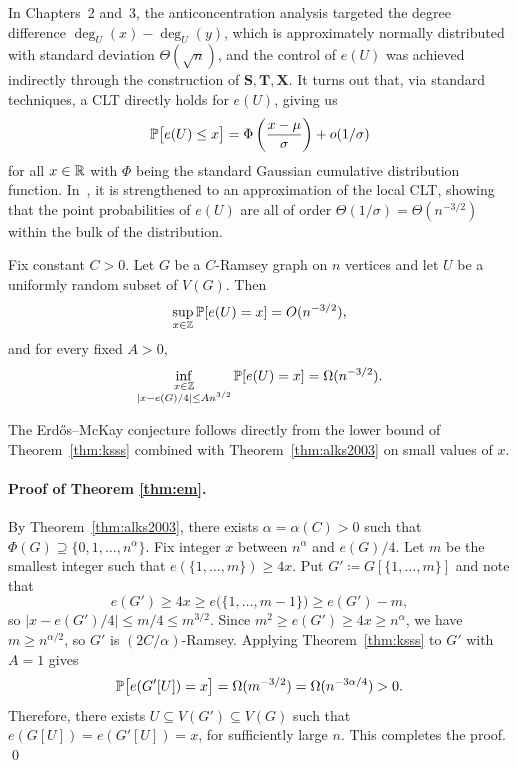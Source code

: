 In Chapters~2 and~3, the anticoncentration analysis targeted the degree difference $\deg_U(x) - \deg_U(y)$, which is approximately normally distributed with standard deviation $\Theta(\sqrt{n})$, and the control of $e(U)$ was achieved indirectly through the construction of $\mathbf{S}, \mathbf{T}, \mathbf{X}$. It turns out that, via standard techniques, a CLT directly holds for $e(U)$, giving us
\[
  \mathbb{P}\bigl[e(U) \leq x\bigr] = \Phi\left(\frac{x - \mu}{\sigma}\right) + o(1/\sigma)
\]
for all $x \in \mathbb{R}$ with $\Phi$ being the standard Gaussian cumulative distribution function. In~\cite{Kwan_2023}, it is strengthened to an approximation of the local CLT, showing that the point probabilities of $e(U)$ are all of order $\Theta(1/\sigma) = \Theta(n^{-3/2})$ within the bulk of the distribution.

\begin{theorem}
  \label{thm:ksss}
  Fix constant $C > 0$. Let $G$ be a $C$-Ramsey graph on $n$ vertices and let $U$ be a uniformly random subset of $V(G)$. Then
  \[
    \sup_{x \in \mathbb{Z}} \mathbb{P}[e(U) = x]
    = O(n^{-3/2}),
  \]
  and for every fixed $A > 0$,
  \[
    \inf_{\substack{x \in \mathbb{Z} \\
      |x - e(G)/4| \leq A n^{3/2}}}
    \mathbb{P}[e(U) = x]
    = \Omega(n^{-3/2}).
  \]
\end{theorem}

The Erd\H{o}s--McKay conjecture follows directly from the lower bound of Theorem~\ref{thm:ksss} combined with Theorem~\ref{thm:alks2003} on small values of $x$.

\paragraph{Proof of Theorem \ref{thm:em}.} 
By Theorem~\ref{thm:alks2003}, there exists $\alpha = \alpha(C) > 0$ such that $\Phi(G) \supseteq \{0, 1, \ldots, n^\alpha\}$. Fix integer $x$ between $n^\alpha$ and $e(G)/4$. Let $m$ be the smallest integer such that $e(\{1, \ldots, m\}) \geq 4x$. Put $G' \coloneqq G[\{1, \ldots, m\}]$ and note that 
\[
  e(G') \geq 4x \geq e\bigl(\{1, \ldots, m-1\}\bigr) \geq e(G') - m,
\]
so $|x - e(G')/4| \leq m/4 \leq m^{3/2}$. Since $m^2 \geq e(G') \geq 4x \geq n^\alpha$, we have $m \geq n^{\alpha/2}$, so $G'$ is $(2C/\alpha)$-Ramsey. Applying Theorem~\ref{thm:ksss} to $G'$ with $A = 1$ gives
\[
  \mathbb{P}\bigl[e(G'[U]) = x\bigr] = \Omega(m^{-3/2}) = \Omega(n^{-3\alpha/4}) > 0.
\]
Therefore, there exists $U \subseteq V(G') \subseteq V(G)$ such that $e(G[U]) = e(G'[U]) = x$, for sufficiently large $n$. This completes the proof. \qed

